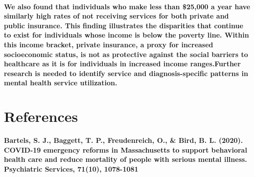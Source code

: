 \documentclass[
  12pt,
]{article}
\begin{document}
\hypertarget{we-also-found-that-individuals-who-make-less-than-25000-a-year-have-similarly-high-rates-of-not-receiving-services-for-both-private-and-public-insurance.-this-finding-illustrates-the-disparities-that-continue-to-exist-for-individuals-whose-income-is-below-the-poverty-line.-within-this-income-bracket-private-insurance-a-proxy-for-increased-socioeconomic-status-is-not-as-protective-against-the-social-barriers-to-healthcare-as-it-is-for-individuals-in-increased-income-ranges.further-research-is-needed-to-identify-service-and-diagnosis-specific-patterns-in-mental-health-service-utilization.}{%
\paragraph{We also found that individuals who make less than \$25,000 a
year have similarly high rates of not receiving services for both
private and public insurance. This finding illustrates the disparities
that continue to exist for individuals whose income is below the poverty
line. Within this income bracket, private insurance, a proxy for
increased socioeconomic status, is not as protective against the social
barriers to healthcare as it is for individuals in increased income
ranges.Further research is needed to identify service and
diagnosis-specific patterns in mental health service
utilization.}\label{we-also-found-that-individuals-who-make-less-than-25000-a-year-have-similarly-high-rates-of-not-receiving-services-for-both-private-and-public-insurance.-this-finding-illustrates-the-disparities-that-continue-to-exist-for-individuals-whose-income-is-below-the-poverty-line.-within-this-income-bracket-private-insurance-a-proxy-for-increased-socioeconomic-status-is-not-as-protective-against-the-social-barriers-to-healthcare-as-it-is-for-individuals-in-increased-income-ranges.further-research-is-needed-to-identify-service-and-diagnosis-specific-patterns-in-mental-health-service-utilization.}}

\newpage

\hypertarget{references}{%
\section{References}\label{references}}

\hypertarget{bartels-s.-j.-baggett-t.-p.-freudenreich-o.-bird-b.-l.-2020.-covid-19-emergency-reforms-in-massachusetts-to-support-behavioral-health-care-and-reduce-mortality-of-people-with-serious-mental-illness.-psychiatric-services-7110-1078-1081}{%
\paragraph{Bartels, S. J., Baggett, T. P., Freudenreich, O., \& Bird, B.
L. (2020). COVID-19 emergency reforms in Massachusetts to support
behavioral health care and reduce mortality of people with serious
mental illness. Psychiatric Services, 71(10),
1078-1081}\label{bartels-s.-j.-baggett-t.-p.-freudenreich-o.-bird-b.-l.-2020.-covid-19-emergency-reforms-in-massachusetts-to-support-behavioral-health-care-and-reduce-mortality-of-people-with-serious-mental-illness.-psychiatric-services-7110-1078-1081}}
\end{document}
